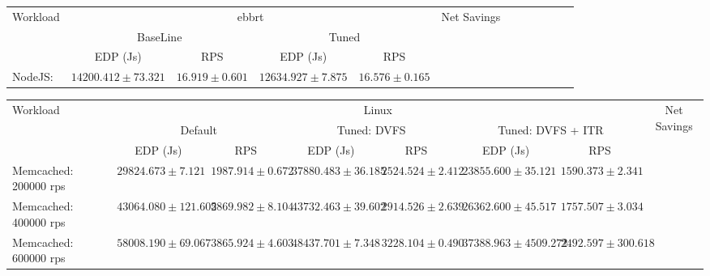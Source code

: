 \begin{table*}[t]
\begin{center}
\begin{tabular}{|l|cc|cc|cc||cc|cc||c|} \hline

\multirow{2}{*}{Workload} & \multicolumn{4}{c|}{ebbrt} & \multirow{2}{*}{Net Savings}\\ 
& \multicolumn{2}{c}{BaseLine} & \multicolumn{2}{c|}{Tuned} &\\
\hline
 & EDP (Js)& RPS & EDP (Js) & RPS & \\  \hline

NodeJS: & $14200.412 \pm 73.321$ & $16.919 \pm 0.601$ & $12634.927 \pm 7.875$ & $16.576 \pm 0.165$ \\ \hline

\hline \hline
\end{tabular}
\end{center}
\end{table*}


\begin{table*}[t]
\begin{center}
\begin{tabular}{|l||cc|cc||cc||c|} \hline
\multirow{2}{*}{Workload} & \multicolumn{6}{c|}{Linux} & \multirow{2}{*}{Net Savings}\\ 
& \multicolumn{2}{c}{Default} & \multicolumn{2}{c}{Tuned: DVFS} & \multicolumn{2}{c|}{Tuned: DVFS + ITR} &\\
\hline

 & EDP (Js)& RPS & EDP (Js) & RPS & EDP (Js) & RPS & \\  \hline

Memcached: 200000 rps & $29824.673 \pm 7.121$ & $1987.914 \pm 0.672$ & $37880.483 \pm 36.185$ & $2524.524 \pm 2.412$ & $23855.600 \pm 35.121$ & $1590.373 \pm 2.341$ \\ \hline
Memcached: 400000 rps & $43064.080 \pm 121.605$ & $2869.982 \pm 8.104$ & $43732.463 \pm 39.602$ & $2914.526 \pm 2.639$ & $26362.600 \pm 45.517$ & $1757.507 \pm 3.034$ \\ \hline
Memcached: 600000 rps & $58008.190 \pm 69.067$ & $3865.924 \pm 4.603$ & $48437.701 \pm 7.348$ & $3228.104 \pm 0.490$ & $37388.963 \pm 4509.272$ & $2492.597 \pm 300.618$ \\ \hline


\hline \hline
\end{tabular}
\end{center}
\end{table*}

